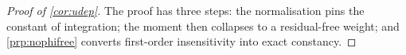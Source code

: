 
\begin{proof}[Proof of \cref{cor:udep}]
The proof has three steps: the normalisation pins the constant of integration; the moment then collapses
to a residual-free weight; and \cref{prp:nophifree} converts first-order insensitivity into exact
constancy.


\end{proof}
